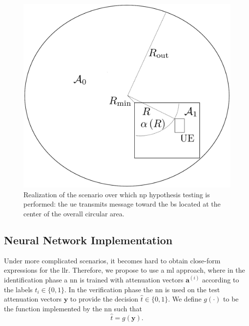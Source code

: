 \documentclass[conference,final]{IEEEtran}
\begin{document}
\begin{figure} 
    \centering
    \includegraphics[width=0.9\columnwidth]{simpleScen.eps}
    \caption{Realization of the scenario over which \ac{np} hypothesis testing is performed: the \ac{ue} transmits message toward the \ac{bs} located at the center of the overall circular area. }
    \label{fig:scen}
\end{figure}

\subsection{Neural Network Implementation}\label{sec:nn}

Under more complicated scenarios, it becomes hard to obtain close-form expressions for the \ac{llr}. Therefore, we propose to use a \ac{ml} approach, where in the identification phase a \ac{nn} is trained with attenuation vectors $\bm{a}^{(i)}$ according to the labels $t_i \in \{0,1\}$. In the verification phase the \ac{nn} is used on the test attenuation vectors $\bm{y}$ to provide the decision $\hat{t} \in \{0,1\}$. We define $g(\cdot)$ to be the function implemented by the \ac{nn} such that
 \begin{equation}
 	\hat{t} = g(\bm{y}).	
 \end{equation}
\end{document}
